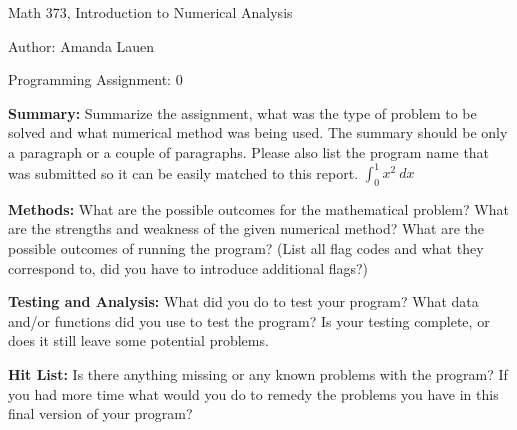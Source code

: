 \documentclass{article}
\begin{document}

\large

{\Large Math 373, Introduction to Numerical Analysis}

\begin{center}
{\Large Author: \hfill Amanda Lauen} %
\end{center}
\par \medskip \par
{\Large Programming Assignment: 0} 
\par \bigskip \par

{\bf Summary:} {\color{black} Summarize the assignment, what was the type of problem to be solved and what numerical method was being used. The summary should be only a paragraph or a couple of paragraphs. Please also list the program name that was submitted so it can be easily matched to this report.} 
$\int_0^1 x^2 \ dx$
\par \bigskip \par

{\bf Methods:} {\color{black} What are the possible outcomes for the mathematical problem? What are the strengths and weakness of the given numerical method? What are the possible outcomes of running the program? (List all flag codes and what they correspond to, did you have to introduce additional flags?)  }
\par \bigskip \par


{\bf Testing and Analysis:} {\color{black} What did you do to test your program? What data and/or functions did you use to test the program? Is your testing complete, or does it still  leave some potential problems.  }
\par \bigskip \par

{\bf Hit List: }{\color{black} Is there anything missing or any known problems with the program? If you had more time what would you do to remedy the problems you have in this final version of your program?}
\par \bigskip \par
\end{document}
